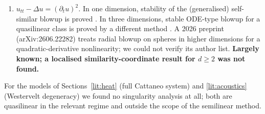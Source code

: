 \begin{enumerate}[leftmargin=1.4em,itemsep=2pt]
Blowup rates are known via Lyapunov functionals \cite{HamzaZaag2010,HamzaZaag2012},
and the one-dimensional profile in \cite{HamzaSaidi2021}. We found no
similarity-coordinate stability result for $d\ge2$. The damping term is an
$O(e^{-\tau})$ perturbation that is non-autonomous and breaks Lorentz
invariance. \textbf{Open in the $H^k$ light-cone sense, expected
perturbative.}
\item \emph{$u_{tt}-\Delta u=(\partial_tu)^2$.} In one dimension, stability
of the (generalised) self-similar blowup is proved
\cite{Gough2025,LiuRaees2025}. In three dimensions, stable ODE-type blowup
for a quasilinear class is proved by a different method \cite{Speck2020}.
A 2026 preprint (arXiv:2606.22282) treats radial blowup on spheres in
higher dimensions for a quadratic-derivative nonlinearity; we could not
verify its author list. %
\textbf{Largely known; a localised similarity-coordinate result for
$d\ge2$ was not found.}
\end{enumerate}
For the models of Sections~\ref{lit:heat} (full Cattaneo system) and
\ref{lit:acoustics} (Westervelt degeneracy) we found no singularity analysis
at all; both are quasilinear in the relevant regime and outside the scope of
the semilinear method.
